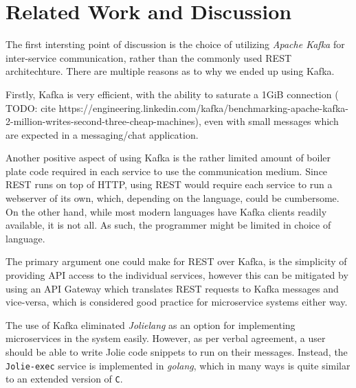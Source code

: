 
\section{Related Work and Discussion}\label{sec:relatedWorkAndDiscussion}


The first intersting point of discussion is the choice of utilizing \textit{Apache Kafka} for inter-service communication, rather than the commonly used REST architechture. 
There are multiple reasons as to why we ended up using Kafka. 

Firstly, Kafka is very efficient, with the ability to saturate a 1GiB connection ({\huge \color{red} TODO:} cite https://engineering.linkedin.com/kafka/benchmarking-apache-kafka-2-million-writes-second-three-cheap-machines), even with small messages which are expected in a messaging/chat application.

Another positive aspect of using Kafka is the rather limited amount of boiler plate code required in each service to use the communication medium. Since REST runs on top of HTTP, using REST would require each service to run a webserver of its own, which, depending on the language, could be cumbersome.
On the other hand, while most modern languages have Kafka clients readily available, it is not all. As such, the programmer might be limited in choice of language.

The primary argument one could make for REST over Kafka, is the simplicity of providing API access to the individual services, however this can be mitigated by using an API Gateway which translates REST requests to Kafka messages and vice-versa, which is considered good practice for microservice systems either way.

\newline 

The use of Kafka eliminated \textit{Jolielang} as an option for implementing microservices in the system easily. However, as per verbal agreement, a user should be able to write Jolie code snippets to run on their messages.
Instead, the \texttt{Jolie-exec} service is implemented in \textit{golang}, which in many ways is quite similar to an extended version of \texttt{C}.

